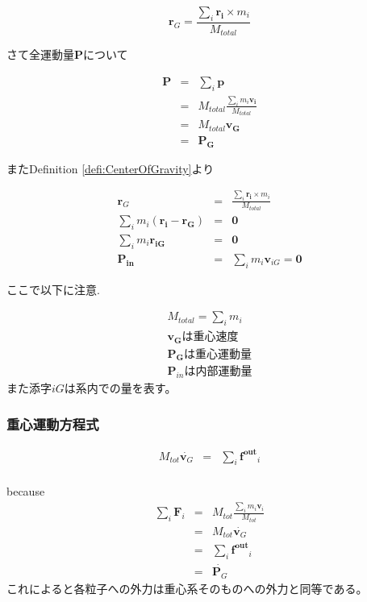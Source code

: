 \documentclass[dvipdfmx]{jsarticle}
\begin{document}
\begin{defi} \label{defi:CenterOfGravity}
$$\bm{r}_G =  \frac{\sum_i \bm{r_i} \times m_i}{M_{total}}$$
\end{defi}

さて全運動量$ \bm{P} $について

\begin{eqnarray*}
\bm{P} &=& \sum_i \bm{p} \\
&=& M_{total} \frac{\sum_i m_i \bm{v_i}}{M_{total}} \\
&=& M_{total} \bm{v_G} \\
&=& \bm{P_G}
\end{eqnarray*}

またDefinition \ref{defi:CenterOfGravity}より

\begin{theo}
\begin{eqnarray*}
\bm{r}_G &=& \frac{\sum_i \bm{r_i} \times m_i}{M_{total}} \\
\sum_i m_i(\bm{r_i} - \bm{r_G}) &=& \bm{0} \\
\sum_i m_i\bm{r_{iG}} &=& \bm{0} \\
\bm{P_{in}} &=& \sum_i m_i \bm{v}_{iG} =\bm{0}
\end{eqnarray*}
\end{theo}

ここで以下に注意.

\begin{eqnarray*}
M_{total} = \sum_i m_i \\
\bm{v_G} は重心速度 \\
\bm{P_G} は重心運動量 \\
\bm{P}_{in}　は内部運動量
\end{eqnarray*}
また添字$iG$は系内での量を表す。

\subsubsection{重心運動方程式}
\begin{theo}
\begin{eqnarray*}
M_{tot} \dot{\bm{v}_G} &=& \sum_i \bm{f^{out}}_i \\
\end{eqnarray*}
\end{theo}
because 
\begin{eqnarray*}
\sum_i \bm{F}_i &=& M_{tot} \frac{\sum_i m_i \bm{v}_i}{M_{tot}} \\
 &=& M_{tot} \dot{\bm{v}_G} \\
 &=& \sum_i \bm{f^{out}}_i \\
 &=& \dot{\bm{P}_G}
\end{eqnarray*}
これによると各粒子への外力は重心系そのものへの外力と同等である。
\end{document}
